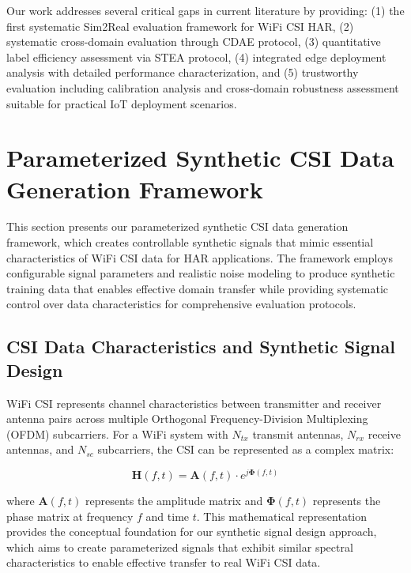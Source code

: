 \documentclass[journal]{IEEEtran}
\begin{document}
Our work addresses several critical gaps in current literature by providing: (1) the first systematic Sim2Real evaluation framework for WiFi CSI HAR, (2) systematic cross-domain evaluation through CDAE protocol, (3) quantitative label efficiency assessment via STEA protocol, (4) integrated edge deployment analysis with detailed performance characterization, and (5) trustworthy evaluation including calibration analysis and cross-domain robustness assessment suitable for practical IoT deployment scenarios.

\section{Parameterized Synthetic CSI Data Generation Framework}

This section presents our parameterized synthetic CSI data generation framework, which creates controllable synthetic signals that mimic essential characteristics of WiFi CSI data for HAR applications. The framework employs configurable signal parameters and realistic noise modeling to produce synthetic training data that enables effective domain transfer while providing systematic control over data characteristics for comprehensive evaluation protocols.

\subsection{CSI Data Characteristics and Synthetic Signal Design}

WiFi CSI represents channel characteristics between transmitter and receiver antenna pairs across multiple Orthogonal Frequency-Division Multiplexing (OFDM) subcarriers. For a WiFi system with $N_{tx}$ transmit antennas, $N_{rx}$ receive antennas, and $N_{sc}$ subcarriers, the CSI can be represented as a complex matrix:

\begin{equation}
\mathbf{H}(f,t) = \mathbf{A}(f,t) \cdot e^{j\boldsymbol{\Phi}(f,t)}
\end{equation}

where $\mathbf{A}(f,t)$ represents the amplitude matrix and $\boldsymbol{\Phi}(f,t)$ represents the phase matrix at frequency $f$ and time $t$. This mathematical representation provides the conceptual foundation for our synthetic signal design approach, which aims to create parameterized signals that exhibit similar spectral characteristics to enable effective transfer to real WiFi CSI data.
\end{document}
